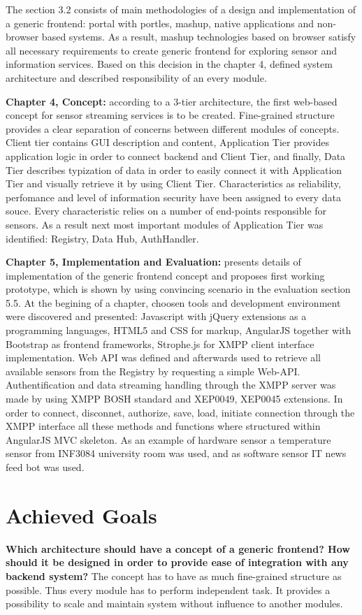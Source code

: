 The section 3.2 consists of main methodologies of a design and implementation of a generic frontend: portal with portles, mashup, native applications and non-browser based systems. As a result, mashup technologies based on browser satisfy all necessary requirements to create generic frontend for exploring sensor and information services. Based on this decision in the chapter 4, defined system architecture and described responsibility of an every module.

\textbf{Chapter 4, Concept:} according to a 3-tier architecture, the first web-based concept for sensor streaming services is to be created. Fine-grained structure provides a clear separation of concerns between different modules of concepts. Client tier contains GUI description and content, Application Tier provides application logic in order to connect backend and Client Tier, and finally, Data Tier describes typization of data in order to easily connect it with Application Tier and visually retrieve it by using Client Tier. Characteristics as reliability, perfomance and level of information security have been assigned to every data souce. Every characteristic relies on a number of end-points responsible for sensors. As a result next most important modules of Application Tier was identified: Registry, Data Hub, AuthHandler.

\textbf{Chapter 5, Implementation and Evaluation:} presents details of implementation of the generic frontend concept and proposes first working prototype, which is shown by using convincing scenario in the evaluation section 5.5. At the begining of a chapter, choosen tools and development environment were discovered and presented: Javascript with jQuery extensions as a programming languages, HTML5 and CSS for markup, AngularJS together with Bootstrap as frontend frameworks, Strophe.js for XMPP client interface implementation. Web API was defined and afterwards used to retrieve all available sensors from the Registry by requesting a simple Web-API. Authentification and data streaming handling through the XMPP server was made by using XMPP BOSH standard and XEP0049, XEP0045 extensions. In order to connect, disconnet, authorize, save, load, initiate connection through the XMPP interface all these methods and functions where structured within AngularJS MVC skeleton. As an example of hardware sensor a temperature sensor from INF3084 university room was used, and as software sensor IT news feed bot was used.

\section{Achieved Goals}
\textbf{Which architecture should have a concept of a generic frontend? How should it be designed in order to provide ease of integration with any backend system?}
\newline
The concept has to have as much fine-grained structure as possible. Thus every module has to perform independent task. It provides a possibility to scale and maintain system without influence to another modules. 

